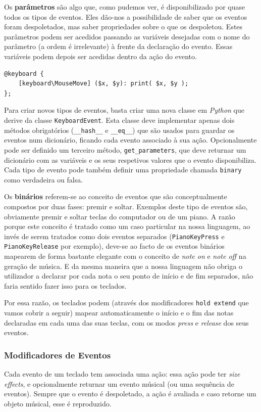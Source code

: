 Os \textbf{parâmetros} são algo que, como pudemos ver, é disponibilizado por quase todos os tipos de eventos. Eles dão-nos a possibilidade de saber que os eventos foram despoletados, mas saber propriedades sobre o que os despoletou. Estes parâmetros podem ser acedidos passando as variáveis desejadas com o nome do parâmetro (a ordem é irrelevante) à frente da declaração do evento. Essas variáveis podem depois ser acedidas dentro da ação do evento.

\begin{lstlisting}[caption={Teclado que imprime as coordenadas do rato sempre que ele se move}]
@keyboard {
    [keyboard\MouseMove] ($x, $y): print( $x, $y );
};
\end{lstlisting}

Para criar novos tipos de eventos, basta criar uma nova classe em \textit{Python} que derive da classe \texttt{KeyboardEvent}. Esta classe deve implementar apenas dois métodos obrigatórios (\texttt{\_\_hash\_\_} e \texttt{\_\_eq\_\_}) que são usados para guardar os eventos num dicionário, ficando cada evento associado à sua ação. Opcionalmente pode ser definido um terceiro método, \texttt{get\_parameters}, que deve returnar um dicionário com as variáveis e os seus respetivos valores que o evento disponibiliza. Cada tipo de evento pode também definir uma propriedade chamada \texttt{binary} como verdadeira ou falsa.

Os \textbf{binários} referem-se ao conceito de eventos que são conceptualmente compostos por duas fases: premir e soltar. Exemplos deste tipo de eventos são, obviamente premir e soltar teclas do computador ou de um piano. A razão porque este conceito é tratado como um caso particular na nossa linguagem, ao invés de serem tratados como dois eventos separados (\texttt{PianoKeyPress} e \texttt{PianoKeyRelease} por exemplo), deve-se ao facto de os eventos binários mapearem de forma bastante elegante com o conceito de \textit{note on} e \textit{note off} na geração de música. E da mesma maneira que a nossa linguagem não obriga o utilizador a declarar por cada nota o seu ponto de início e de fim separados, não faria sentido fazer isso para os teclados.

Por essa razão, os teclados podem (através dos modificadores \texttt{hold extend} que vamos cobrir a seguir) mapear automaticamente o início e o fim das notas declaradas em cada uma das suas teclas, com os modos \textit{press} e \textit{release} dos seus eventos.

\subsubsection{Modificadores de Eventos}
Cada evento de um teclado tem associada uma ação: essa ação pode ter \textit{size effects}, e opcionalmente returnar um evento músical (ou uma sequência de eventos). Sempre que o evento é despoletado, a ação é avaliada e caso retorne um objeto músical, esse é reproduzido.

